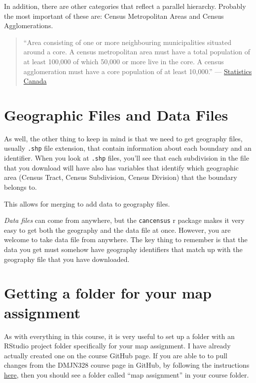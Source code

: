 \documentclass[
]{article}
\begin{document}
In addition, there are other categories that reflect a parallel
hierarchy. Probably the most important of these are: Census Metropolitan
Areas and Census Agglomerations.

\begin{quote}
``Area consisting of one or more neighbouring municipalities situated
around a core. A census metropolitan area must have a total population
of at least 100,000 of which 50,000 or more live in the core. A census
agglomeration must have a core population of at least 10,000.''
\hfill ---
\href{https://www12.statcan.gc.ca/census-recensement/2011/ref/dict/geo009-eng.cfm}{Statistics
Canada}
\end{quote}

\hypertarget{geographic-files-and-data-files}{%
\section{Geographic Files and Data
Files}\label{geographic-files-and-data-files}}

As well, the other thing to keep in mind is that we need to get
geography files, usually \texttt{.shp} file extension, that contain
information about each boundary and an identifier. When you look at
\texttt{.shp} files, you'll see that each subdivision in the file that
you download will have also has variables that identify which geographic
area (Census Tract, Census Subdivision, Census Division) that the
boundary belongs to.

This allows for merging to add data to geography files.

\emph{Data files} can come from anywhere, but the \texttt{cancensus} r
package makes it very easy to get both the geography and the data file
at once. However, you are welcome to take data file from anywhere. The
key thing to remember is that the data you get must somehow have
geography identifiers that match up with the geography file that you
have downloaded.

\hypertarget{getting-a-folder-for-your-map-assignment}{%
\section{Getting a folder for your map
assignment}\label{getting-a-folder-for-your-map-assignment}}

As with everything in this course, it is very useful to set up a folder
with an RStudio project folder specifically for your map assignment. I
have already actually created one on the course GitHub page. If you are
able to to pull changes from the DMJN328 course page in GitHub, by
following the instructions
\href{https://github.com/sjkiss/DMJN328/raw/master/Using_github/syncing_to_course_repository.pdf}{here},
then you should see a folder called ``map assignment'' in your course
folder.
\end{document}
